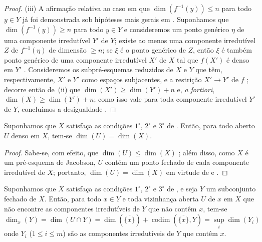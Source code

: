\begin{proof}
(iii) A afirmação relativa ao caso em que $\dim(f^{-1}(y))\leq n$ para todo $y\in Y$ já foi demonstrada sob hipóteses mais gerais em .
Suponhamos que $\dim(f^{-1}(y))\geq n$ para todo $y\in Y$ e consideremos um ponto genérico $\eta$ de uma componente irredutível $Y'$ de $Y$; existe ao menos uma componente irredutível $Z$ de $f^{-1}(\eta)$ de dimensão $\geq n$; se $\xi$ é o ponto genérico de $Z$, então $\xi$ é também ponto genérico de uma componente irredutível $X'$ de $X$ tal que $f(X')$ é denso em $Y'$ .
Consideremos os subpré-esquemas reduzidos de $X$ e $Y$ que têm, respectivamente, $X'$ e $Y'$ como espaços subjacentes, e a restrição $X'\to Y'$ de $f$ ; decorre então de~(ii) que $\dim(X')\geq\dim(Y')+n$ e, \emph{a fortiori}, $\dim(X)\geq\dim(Y')+n$; como isso vale para toda componente irredutível $Y'$ de $Y$, concluímos a desigualdade .
\end{proof}

\begin{corollary}[10.6.2]
\label{IV.10.6.2}
Suponhamos que $X$ satisfaça as condições $1^\circ$, $2^\circ$ e $3^\circ$ de .
Então, para todo aberto $U$ denso em $X$, tem-se $\dim(U)=\dim(X)$.
\end{corollary}

\begin{proof}
Sabe-se, com efeito, que $\dim(U)\leq\dim(X)$ ; além disso, como $X$ é um pré-esquema de Jacobson, $U$ contém um ponto fechado de cada componente irredutível de $X$; portanto, $\dim(U)=\dim(X)$ em virtude de  e .
\end{proof}

\begin{proposition}[10.6.3]
\label{IV.10.6.3}
Suponhamos que $X$ satisfaça as condições $1^\circ$, $2^\circ$ e $3^\circ$ de , e seja $Y$ um subconjunto fechado de $X$.
Então, para todo $x\in Y$ e toda vizinhança aberta $U$ de $x$ em $X$ que não encontre as componentes irredutíveis de $Y$ que não contêm $x$, tem-se
\begin{equation}
\label{IV.10.6.3.1}
\tag{10.6.3.1}
\dim_x(Y)=\dim(U\cap Y)=\dim(\overline{\{x\}})
 +\operatorname{codim}(\overline{\{x\}},Y)=\sup_i\dim(Y_i)
\end{equation}
onde $Y_i$ ($1\leq i\leq m$) são as componentes irredutíveis de $Y$ que contêm $x$.
\end{proposition}

